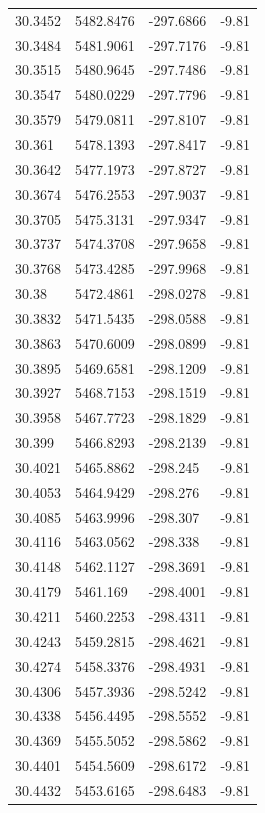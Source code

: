 \begin{table}[H]
\begin{tabular}{llll}
30.3452 & 5482.8476 & -297.6866 & -9.81 \\
30.3484 & 5481.9061 & -297.7176 & -9.81 \\
30.3515 & 5480.9645 & -297.7486 & -9.81 \\
30.3547 & 5480.0229 & -297.7796 & -9.81 \\
30.3579 & 5479.0811 & -297.8107 & -9.81 \\
30.361 & 5478.1393 & -297.8417 & -9.81 \\
30.3642 & 5477.1973 & -297.8727 & -9.81 \\
30.3674 & 5476.2553 & -297.9037 & -9.81 \\
30.3705 & 5475.3131 & -297.9347 & -9.81 \\
30.3737 & 5474.3708 & -297.9658 & -9.81 \\
30.3768 & 5473.4285 & -297.9968 & -9.81 \\
30.38 & 5472.4861 & -298.0278 & -9.81 \\
30.3832 & 5471.5435 & -298.0588 & -9.81 \\
30.3863 & 5470.6009 & -298.0899 & -9.81 \\
30.3895 & 5469.6581 & -298.1209 & -9.81 \\
30.3927 & 5468.7153 & -298.1519 & -9.81 \\
30.3958 & 5467.7723 & -298.1829 & -9.81 \\
30.399 & 5466.8293 & -298.2139 & -9.81 \\
30.4021 & 5465.8862 & -298.245 & -9.81 \\
30.4053 & 5464.9429 & -298.276 & -9.81 \\
30.4085 & 5463.9996 & -298.307 & -9.81 \\
30.4116 & 5463.0562 & -298.338 & -9.81 \\
30.4148 & 5462.1127 & -298.3691 & -9.81 \\
30.4179 & 5461.169 & -298.4001 & -9.81 \\
30.4211 & 5460.2253 & -298.4311 & -9.81 \\
30.4243 & 5459.2815 & -298.4621 & -9.81 \\
30.4274 & 5458.3376 & -298.4931 & -9.81 \\
30.4306 & 5457.3936 & -298.5242 & -9.81 \\
30.4338 & 5456.4495 & -298.5552 & -9.81 \\
30.4369 & 5455.5052 & -298.5862 & -9.81 \\
30.4401 & 5454.5609 & -298.6172 & -9.81 \\
30.4432 & 5453.6165 & -298.6483 & -9.81 \\

\end{tabular}
\end{table}
